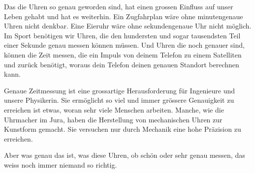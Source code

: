 Das die Uhren so genau geworden sind, hat einen grossen Einfluss auf unser
Leben gehabt und hat es weiterhin. Ein Zugfahrplan wäre ohne minutengenaue
Uhren nicht denkbar. Eine Eieruhr wäre ohne sekundengenaue Uhr nicht möglich.
Im Sport benötigen wir Uhren, die den hundersten und sogar tausendsten Teil
einer Sekunde genau messen können müssen. Und Uhren die noch genauer sind,
können die Zeit messen, die ein Impuls von deinem Telefon zu einem Satelliten
und zurück benötigt, woraus dein Telefon deinen genauen Standort berechnen
kann. 

Genaue Zeitmessung ist eine grossartige Herausforderung für Ingenieure und
unsere Physikerin. Sie ermöglicht so viel und immer grössere Genauigkeit zu
erreichen ist etwas, woran sehr viele Menschen arbeiten. Manche, wie die
Uhrmacher im Jura, haben die Herstellung von mechanischen Uhren zur Kunstform
gemacht. Sie versuchen nur durch Mechanik eine hohe Präzision zu erreichen. 

Aber was genau das ist, was diese Uhren, ob schön oder sehr genau messen, das
weiss noch immer niemand so richtig.


